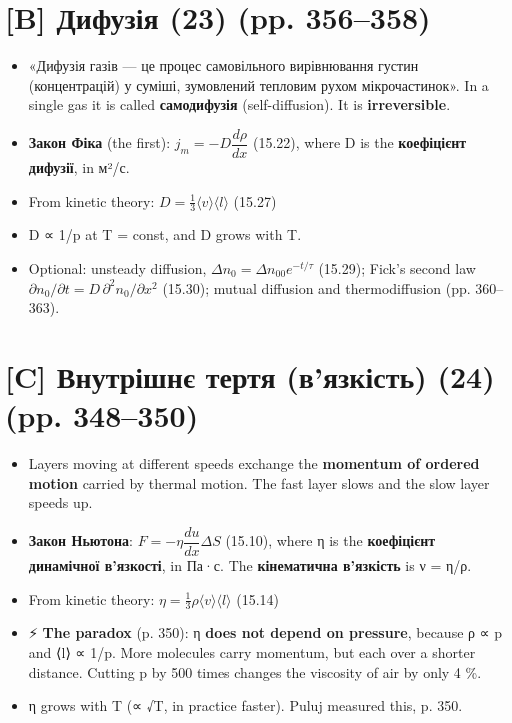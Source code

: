 \documentclass[11pt,a4paper,oneside]{book}
\newcommand{\spark}{{\sffamily\color{warncol}⚡}}
\begin{document}
\section*{[B] Дифузія (23) (pp. 356–358)}
\begin{itemize}
\item «Дифузія газів — це процес самовільного вирівнювання густин (концентрацій) у суміші, зумовлений тепловим рухом мікрочастинок». In a single gas it is called \textbf{самодифузія} (self-diffusion). It is \textbf{irreversible}.
\item \textbf{Закон Фіка} (the first): $j_m = -D\dfrac{d\rho}{dx}$ (15.22), where D is the \textbf{коефіцієнт дифузії}, in м²/с.
\item From kinetic theory: $D = \tfrac13\langle v\rangle\langle l\rangle$ (15.27)
\item D ∝ 1/p at T = const, and D grows with T.
\item Optional: unsteady diffusion, $\Delta n_0 = \Delta n_{00}e^{-t/\tau}$ (15.29); Fick's second law $\partial n_0/\partial t = D\,\partial^2n_0/\partial x^2$ (15.30); mutual diffusion and thermodiffusion (pp. 360–363).
\end{itemize}

\section*{[C] Внутрішнє тертя (в'язкість) (24) (pp. 348–350)}
\begin{itemize}
\item Layers moving at different speeds exchange the \textbf{momentum of ordered motion} carried by thermal motion. The fast layer slows and the slow layer speeds up.
\item \textbf{Закон Ньютона}: $F = -\eta\dfrac{du}{dx}\Delta S$ (15.10), where η is the \textbf{коефіцієнт динамічної в'язкості}, in Па·с. The \textbf{кінематична в'язкість} is ν = η/ρ.
\item From kinetic theory: $\eta = \tfrac13\rho\langle v\rangle\langle l\rangle$ (15.14)
\item \spark{} \textbf{The paradox} (p. 350): η \textbf{does not depend on pressure}, because ρ ∝ p and ⟨l⟩ ∝ 1/p. More molecules carry momentum, but each over a shorter distance. Cutting p by 500 times changes the viscosity of air by only 4 \%.
\item η grows with T (∝ √T, in practice faster). Puluj measured this, p. 350.
\end{itemize}
\end{document}
